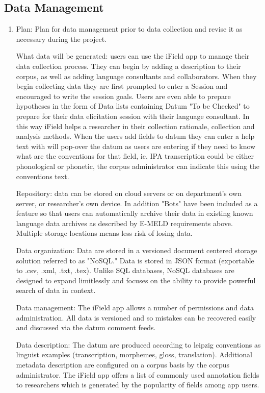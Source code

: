 \documentclass[12 pt]{article}
\begin{document}
\subsection {Data Management }

\begin{enumerate} 

\item Plan: Plan for data management prior to data collection and revise it as necessary during the project. 


What data will be generated: users can use the iField app to manage their data collection process. They can begin by adding a description to their corpus, as well as adding language consultants and collaborators. When they begin collecting data they are first prompted to enter a Session and encouraged to write the session goals. Users are even able to prepare hypotheses in the form of Data lists containing Datum "To be Checked" to prepare for their data elicitation session with their language consultant. In this way iField helps a researcher in their collection rationale, collection and analysis methods. When the users add fields to datum they can enter a help text with will pop-over the datum as users are entering if they need to know what are the conventions for that field, ie. IPA transcription could be either phonological or phonetic, the corpus administrator can indicate this using the conventions text. 

Repository:  data can be stored on cloud servers or on department's own server, or researcher's own device. In addition "Bots" have been included as a feature so that users can automatically archive their data in existing known language data archives as described by E-MELD requirements above. Multiple storage locations means less risk of losing data.

Data organization: Data are stored in a versioned document centered storage solution referred to as "NoSQL." Data is stored in JSON format (exportable to .csv, .xml, .txt, .tex). Unlike SQL databases, NoSQL databases are designed to expand limitlessly and focuses on the ability to provide powerful search of data in context.

Data management: The iField app allows a number of permissions and data administration. All data is versioned and so mistakes can be recovered easily and discussed via the datum comment feeds. 

Data description: The datum are produced according to leipzig conventions as linguist examples (transcription, morphemes, gloss, translation). Additional metadata description are configured on a corpus basis by the corpus administrator. The iField app offers a list of commonly used annotation fields to researchers which is generated by the popularity of fields among app users. 


\end{enumerate}
\end{document}
